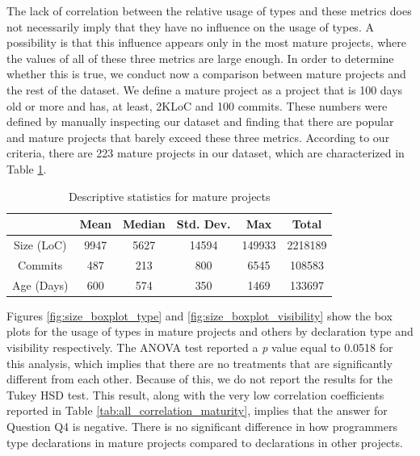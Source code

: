 \documentclass[msc]{ppgccufmg}
\renewcommand{\arraystretch}{1.2}
\begin{document}
The lack of correlation between the relative usage of types and these metrics does not necessarily imply that they have no influence on the usage of types.
A possibility is that this influence appears only in the most mature projects, where the values of all of these three metrics are large enough.
In order to determine whether this is true, we conduct now a comparison between mature projects and the rest of the dataset.
We define a mature project as a project that is 100 days old or more and has, at least, 2KLoC and 100 commits.
These numbers were defined by manually inspecting our dataset and finding that there are popular and mature projects that barely exceed these three metrics.
According to our criteria, there are 223 mature projects in our dataset, which are characterized in Table \ref{tab:mature_dataset_characterization}.


\begin{table}[h!]

\centering{}%
\renewcommand{\arraystretch}{1.2}

\caption{Descriptive statistics for mature projects}
\begin{tabular}{|c|c|c|c|c|c|}
\hline
{}    & Mean  & Median  & Std. Dev. & Max & Total   \\
\hline
\hline
Size (LoC)  & 9947  & 5627 & 14594  & 149933  & 2218189 \\ \hline
Commits     & 487   & 213    & 800   & 6545   & 108583  \\ \hline
Age (Days)  & 600   & 574  & 350   & 1469   & 133697  \\ \hline
\end{tabular}
\label{tab:mature_dataset_characterization}
\end{table}

Figures \ref{fig:size_boxplot_type}  and \ref{fig:size_boxplot_visibility} show the box plots for the usage of types in mature projects and others by declaration type and visibility respectively.
The ANOVA test reported a \emph{p} value equal to 0.0518 for this analysis, which implies that there are no treatments that are significantly different from each other.
Because of this, we do not report the results for the Tukey HSD test.
This result, along with the very low correlation coefficients reported in Table \ref{tab:all_correlation_maturity}, implies that the answer for Question Q4 is negative.
There is no significant difference in how programmers type declarations in mature projects compared to declarations in other projects.
\end{document}
